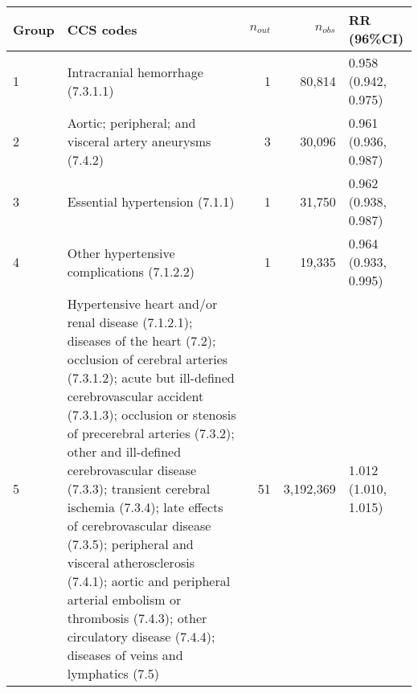 \begin{tabular}{lp{6.5cm}rrp{2.2cm}}
  \hline
Group & CCS codes & $n_{out}$ & $n_{obs}$ & RR (96\%CI) \\ 
  \hline
   1 & Intracranial hemorrhage (7.3.1.1) &    1 & 80,814 & 0.958 (0.942, 0.975) \\ 
     2 & Aortic; peripheral; and visceral artery aneurysms (7.4.2) &    3 & 30,096 & 0.961 (0.936, 0.987) \\ 
     3 & Essential hypertension (7.1.1) &    1 & 31,750 & 0.962 (0.938, 0.987) \\ 
     4 & Other hypertensive complications (7.1.2.2) &    1 & 19,335 & 0.964 (0.933, 0.995) \\ 
     5 & Hypertensive heart and/or renal disease (7.1.2.1); diseases of the heart (7.2); occlusion of cerebral arteries (7.3.1.2); acute but ill-defined cerebrovascular accident (7.3.1.3); occlusion or stenosis of precerebral arteries (7.3.2); other and ill-defined cerebrovascular disease (7.3.3); transient cerebral ischemia (7.3.4); late effects of cerebrovascular disease (7.3.5); peripheral and visceral atherosclerosis (7.4.1); aortic and peripheral arterial embolism or thrombosis (7.4.3); other circulatory disease (7.4.4); diseases of veins and lymphatics (7.5) &   51 & 3,192,369 & 1.012 (1.010, 1.015) \\ 
   \hline
\end{tabular}

